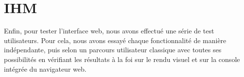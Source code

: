 \section{IHM}
Enfin, pour tester l'interface web, nous avons effectué une série de test utilisateurs. Pour cela, nous avons essayé chaque fonctionnalité de manière indépendante, puis selon un parcours utilisateur classique avec toutes ses possibilités en vérifiant les résultats à la foi sur le rendu visuel et sur la console intégrée du navigateur web.